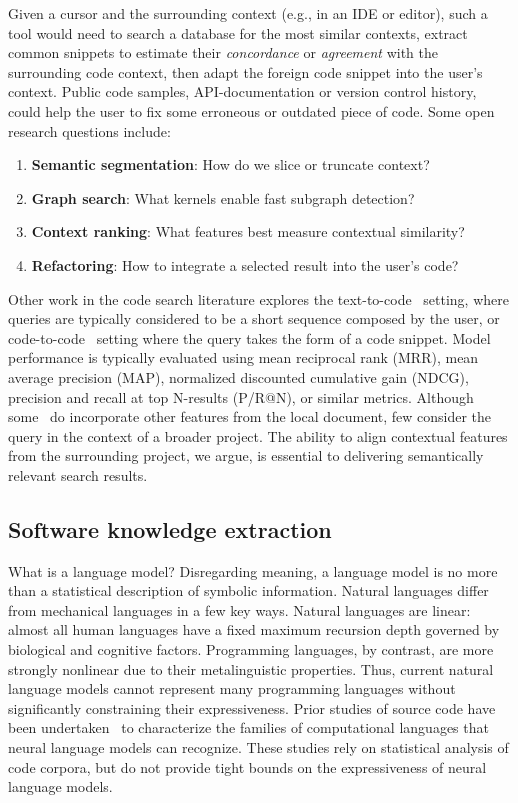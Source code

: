 \documentclass[12pt]{article}
\begin{document}
Given a cursor and the surrounding context (e.g., in an IDE or editor), such a tool would need to search a database for the most similar contexts, extract common snippets to estimate their \textit{concordance} or \textit{agreement} with the surrounding code context, then adapt the foreign code snippet into the user's context. Public code samples, API-documentation or version control history, could help the user to fix some erroneous or outdated piece of code. Some open research questions include:

  \begin{enumerate}
    \item \textbf{Semantic segmentation}: How do we slice or truncate context?
    \item \textbf{Graph search}: What kernels enable fast subgraph detection?
    \item \textbf{Context ranking}: What features best measure contextual similarity?
    \item \textbf{Refactoring}: How to integrate a selected result into the user's code?
  \end{enumerate}

Other work in the code search literature explores the text-to-code~\cite{husain2019codesearchnet} setting, where queries are typically considered to be a short sequence composed by the user, or code-to-code~\cite{kim2018facoy} setting where the query takes the form of a code snippet. Model performance is typically evaluated using mean reciprocal rank (MRR), mean average precision (MAP), normalized discounted cumulative gain (NDCG), precision and recall at top N-results (P/R@N), or similar metrics. Although some~\cite{asyrofi2020ausearch} do incorporate other features from the local document, few consider the query in the context of a broader project. The ability to align contextual features from the surrounding project, we argue, is essential to delivering semantically relevant search results.

  \subsection{Software knowledge extraction}\label{subsec:knowledge-extraction}

What is a language model? Disregarding meaning, a language model is no more than a statistical description of symbolic information. Natural languages differ from mechanical languages in a few key ways. Natural languages are linear: almost all human languages have a fixed maximum recursion depth governed by biological and cognitive factors. Programming languages, by contrast, are more strongly nonlinear due to their metalinguistic properties. Thus, current natural language models cannot represent many programming languages without significantly constraining their expressiveness. Prior studies of source code have been undertaken~\cite{weiss2018practical, chirkova2020empirical, chen2021evaluating} to characterize the families of computational languages that neural language models can recognize. These studies rely on statistical analysis of code corpora, but do not provide tight bounds on the expressiveness of neural language models.
\end{document}
